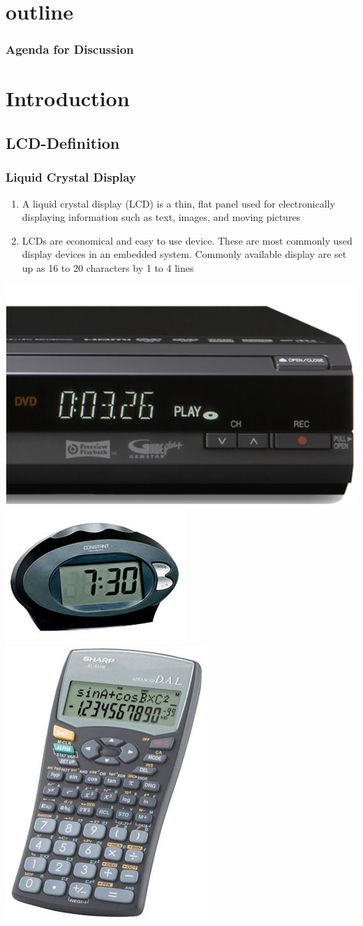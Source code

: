 \documentclass[10pt,red]{beamer}
\title
[
	Firebird LPC2148 Robotics Research Platform	%
	\hspace{0.5cm}
	\insertframenumber/\inserttotalframenumber
]
{
	LCD Interfacing on Firebird V Robot
}
\author
[
	www.e-yantra.org
]
{
	e-Yantra Team \\[20pt]
  Embedded Real-Time Systems Lab\\
  Indian Institute of Technology-Bombay \\
}
\date
{
IIT Bombay \\ {\today}
}
\begin{document}
  

\begin{frame}
   \titlepage
\end{frame}

\section*{outline}
\begin{frame}
	\frametitle{Agenda for Discussion}
	\tableofcontents
\end{frame}

\section{Introduction}
\subsection{LCD-Definition}
\begin{frame}
	\frametitle{Liquid Crystal Display} \pause
	\begin{enumerate}
		\item<+-|alert@+> A liquid crystal display (LCD) is a thin, flat panel used for electronically displaying information such as text, images, and moving pictures \\[10pt]
		
		\item<+-|alert@+> LCDs are economical and easy to use device. These are most commonly used display devices in an embedded system. Commonly available display are set up as 16 to 20 characters by 1 to 4 lines \\[15pt] 
		\end{enumerate} 
		\pause
		\includegraphics[width=0.2\linewidth]{example_1} 
		\hspace{1.5cm}
		\includegraphics[width=0.2\linewidth]{example_2}
		\hspace{1.5cm}
		\includegraphics[width=0.2\linewidth]{example_3}
	
\end{frame}
\end{document}
